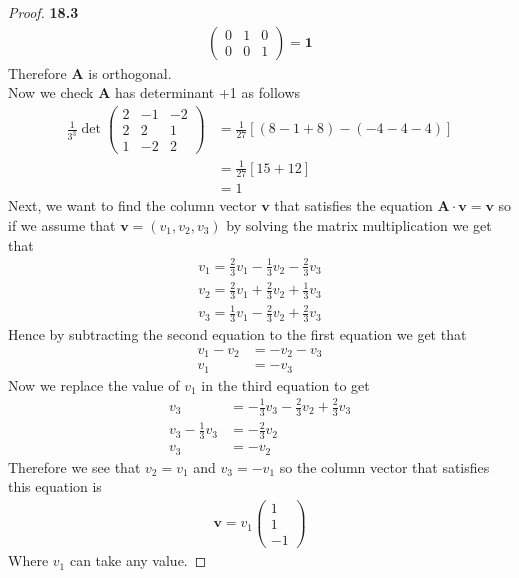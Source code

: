 \documentclass[11pt]{article}
\theoremstyle{definition}
\begin{document}
\begin{proof}{\textbf{18.3}}
\begin{align*}
\begin{pmatrix}
            0 & 1 & 0\\
            0 & 0 & 1
        \end{pmatrix} = \bm{1}
    \end{align*}
    Therefore $\bm{A}$ is orthogonal.\\
    Now we check $\bm{A}$ has determinant +1 as follows
    \begin{align*}
        \frac{1}{3^3}\det\begin{pmatrix}
            2 & -1 & -2\\
            2 & 2  & 1\\
            1 & -2 & 2
        \end{pmatrix} &= \frac{1}{27}[(8 -1 + 8) - (-4 -4 -4)]\\
        &= \frac{1}{27}[15 + 12]\\
        &= 1
    \end{align*}
    Next, we want to find the column vector $\bm{v}$ that satisfies the equation
    $\bm{A}\cdot\bm{v} = \bm{v}$ so if we assume that $\bm{v} = (v_1, v_2, v_3)$
    by solving the matrix multiplication we get that
    \begin{align*}
        v_1 = \frac{2}{3}v_1 - \frac{1}{3}v_2 - \frac{2}{3}v_3\\
        v_2 = \frac{2}{3}v_1 + \frac{2}{3}v_2 + \frac{1}{3}v_3\\
        v_3 = \frac{1}{3}v_1 - \frac{2}{3}v_2 + \frac{2}{3}v_3
    \end{align*}
    Hence by subtracting the second equation to the first equation we get that
    \begin{align*}
        v_1 - v_2 &= -v_2 - v_3\\
        v_1 &= -v_3
    \end{align*}
    Now we replace the value of $v_1$ in the third equation to get 
    \begin{align*}
        v_3 &= -\frac{1}{3}v_3 - \frac{2}{3}v_2 + \frac{2}{3}v_3\\
        v_3 - \frac{1}{3}v_3 &= - \frac{2}{3}v_2\\
        v_3 &= -v_2
    \end{align*}
    Therefore we see that $v_2 = v_1$ and $v_3 = -v_1$ so the column vector
    that satisfies this equation is
    \begin{align*}
        \bm{v} = v_1\begin{pmatrix}
            1\\ 1\\ -1
        \end{pmatrix}
    \end{align*}
    Where $v_1$ can take any value.


\end{proof}
\end{document}
